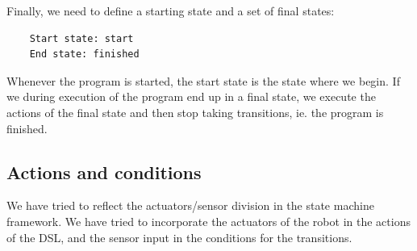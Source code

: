 \documentclass[11pt,a4paper]{article}
\begin{document}
Finally, we need to define a starting state and a set of final states:
\begin{verbatim}
    Start state: start 
    End state: finished
\end{verbatim}
Whenever the program is started, the start state is the state where we begin. 
If we during execution of the program end up in a final state, we execute the actions of the final state and then stop taking transitions, ie. the program is finished.

\subsection{Actions and conditions}
We have tried to reflect the actuators/sensor division in the state machine framework. We have tried to incorporate the actuators of the robot in the actions of the DSL, and the sensor input in the conditions for the transitions.
\end{document}
